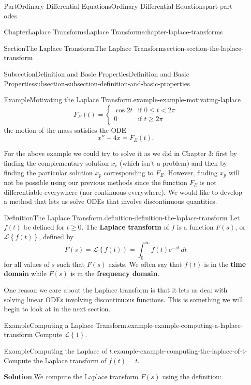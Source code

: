 \documentclass[twoside,10pt,]{book}
\newcommand{\blocktitlefont}{\relax}
\newcommand{\terminology}[1]{\textbf{#1}}
\numberwithin{equation}{part}
\newcommand{\lt}{<}
\newcommand{\amp}{&}
\begin{document}
\begin{partptx}{Part}{Ordinary Differential Equations}{}{Ordinary Differential Equations}{}{}{part-part-odes}
\begin{chapterptx}{Chapter}{Laplace Transforms}{}{Laplace Transforms}{}{}{chapter-laplace-transforms}
\begin{sectionptx}{Section}{The Laplace Transform}{}{The Laplace Transform}{}{}{section-section-the-laplace-transform}
\begin{subsectionptx}{Subsection}{Definition and Basic Properties}{}{Definition and Basic Properties}{}{}{subsection-subsection-definition-and-basic-properties}
\begin{example}{Example}{Motivating the Laplace Transform.}{example-example-motivating-laplace}
\begin{equation*}
F_{E}(t) = 
\begin{cases}
\cos2t \amp \text{if }0\leq t\lt 2\pi\\
0 \amp\text{if } t\geq2\pi  
\end{cases}
\end{equation*}
the motion of the mass satisfies the ODE%
\begin{equation*}
x''+4x = F_{E}(t).
\end{equation*}
%
\end{example}
For the above example we could try to solve it as we did in Chapter 3: first by finding the complementary solution \(x_{c}\) (which isn't a problem) and then by finding the particular solution \(x_{p}\) corresponding to \(F_{E}\). However, finding \(x_{p}\) will not be possible using our previous methods since the function \(F_{E}\) is not differentiable everywhere (nor continuous everywhere). We would like to develop a method that lets us solve ODEs that involve discontinuous quantities.%
\begin{definition}{Definition}{The Laplace Transform.}{definition-definition-the-laplace-transform}%
%
Let \(f(t)\) be defined for \(t\geq0\). The \terminology{Laplace transform} of \(f\) is a function \(F(s)\), or \(\mathcal{L}\left\{ f(t) \right\}\), defined by%
\begin{equation*}
F(s) = \mathcal{L}\left\{ f(t) \right\} = \int_{0}^{\infty}f(t)e^{-st}\,dt
\end{equation*}
for all values of \(s\) such that \(F(s)\) exists. We often say that \(f(t)\) is in the \terminology{time domain} while \(F(s)\) is in the \terminology{frequency domain}.%
\end{definition}
One reason we care about the Laplace transform is that it lets us deal with solving linear ODEs involving discontinuous functions. This is something we will begin to look at in the next section.%
\begin{example}{Example}{Computing a Laplace Transform.}{example-example-computing-a-laplace-transform}%
Compute \(\mathcal{L}\left\{ 1 \right\}\).%
\end{example}
\begin{example}{Example}{Computing the Laplace of \(t\).}{example-example-computing-the-laplace-of-t-}%
Compute the Laplace transform of \(f(t) = t\).%
\par\smallskip%
\noindent\textbf{\blocktitlefont Solution}.\hypertarget{solution-example-computing-the-laplace-of-t--c}{}\quad{}We compute the Laplace transform \(F(s)\) using the definition:%

\end{example}
\end{subsectionptx}
\end{sectionptx}
\end{chapterptx}
\end{partptx}
\end{document}
